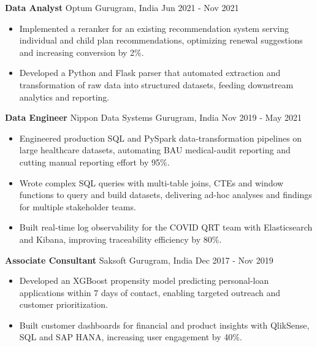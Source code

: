 \documentclass[10pt,a4paper]{article}
\newcommand{\role}[4]{\textbf{#1} \textbar{} #2 \hfill #3 \textbar{} #4\par}
\begin{document}
\vspace{3pt}
\role{Data Analyst}{Optum}{Gurugram, India}{Jun 2021 - Nov 2021}
\begin{itemize}
  \item Implemented a reranker for an existing recommendation system serving individual and child plan recommendations, optimizing renewal suggestions and increasing conversion by 2\%.
  \item Developed a Python and Flask parser that automated extraction and transformation of raw data into structured datasets, feeding downstream analytics and reporting.
\end{itemize}
\vspace{3pt}
\role{Data Engineer}{Nippon Data Systems}{Gurugram, India}{Nov 2019 - May 2021}
\begin{itemize}
  \item Engineered production SQL and PySpark data-transformation pipelines on large healthcare datasets, automating BAU medical-audit reporting and cutting manual reporting effort by 95\%.
  \item Wrote complex SQL queries with multi-table joins, CTEs and window functions to query and build datasets, delivering ad-hoc analyses and findings for multiple stakeholder teams.
  \item Built real-time log observability for the COVID QRT team with Elasticsearch and Kibana, improving traceability efficiency by 80\%.
\end{itemize}
\vspace{3pt}
\role{Associate Consultant}{Saksoft}{Gurugram, India}{Dec 2017 - Nov 2019}
\begin{itemize}
  \item Developed an XGBoost propensity model predicting personal-loan applications within 7 days of contact, enabling targeted outreach and customer prioritization.
  \item Built customer dashboards for financial and product insights with QlikSense, SQL and SAP HANA, increasing user engagement by 40\%.
\end{itemize}
\end{document}
